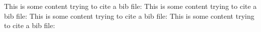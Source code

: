 \documentclass{article}
\begin{document}
This is some content trying to cite a bib file: \cite{Einstein1920a}
This is some content trying to cite a bib file: \cite{Einstein1920b}
This is some content trying to cite a bib file: \cite{Einstein1920c}
This is some content trying to cite a bib file: \cite{UnresolvedKey}



\end{document}
